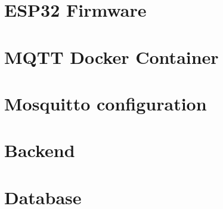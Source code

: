 \chapter{ESP32 Firmware}


\chapter{MQTT Docker Container}


\chapter{Mosquitto configuration}


\chapter{Backend}\label{sec:backend}




\chapter{Database}


